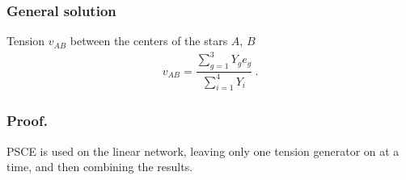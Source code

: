 \documentclass[letterpaper,10pt,italian]{jupyterBook}
\begin{document}
\subsubsection{General solution}
\label{\detokenize{ch/electrical-engineering-three-phase:general-solution}}
\sphinxAtStartPar
Tension \(v_{AB}\) between the centers of the stars \(A\), \(B\)
\begin{equation*}
\begin{split}v_{AB} = \dfrac{\sum_{g=1}^{3} Y_g e_g}{\sum_{i=1}^{4} Y_i} \ .\end{split}
\end{equation*}\subsubsection*{Proof.}

\sphinxAtStartPar
PSCE is used on the linear network, leaving only one tension generator on at a time, and then combining the results.
\end{document}
